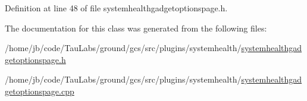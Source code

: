\-Definition at line 48 of file systemhealthgadgetoptionspage.\-h.



\-The documentation for this class was generated from the following files\-:\begin{DoxyCompactItemize}
\item 
/home/jb/code/\-Tau\-Labs/ground/gcs/src/plugins/systemhealth/\hyperlink{systemhealthgadgetoptionspage_8h}{systemhealthgadgetoptionspage.\-h}\item 
/home/jb/code/\-Tau\-Labs/ground/gcs/src/plugins/systemhealth/\hyperlink{systemhealthgadgetoptionspage_8cpp}{systemhealthgadgetoptionspage.\-cpp}\end{DoxyCompactItemize}
